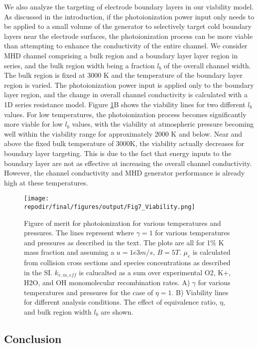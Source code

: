 We also analyze the targeting of electrode boundary layers in our viability model. As discussed in the introduction, if the photoionization power input only needs to be applied to a small volume of the generator to selectively target cold boundary layers near the electrode surfaces, the photoionization process can be more viable than attempting to enhance the conductivity of the entire channel. We consider MHD channel comprising a bulk region and a boundary layer layer region in series, and the bulk region width being a fraction $l_b$ of the overall channel width. The bulk region is fixed at 3000 K and the temperature of the boundary layer region is varied. The photoionization power input is applied only to the boundary layer region, and the change in overall channel conductivity is calculated with a 1D series resistance model. Figure \ref{fig:viability_gamma}B shows the viability lines for two different $l_b$ values. For low temperatures, the photoionization process becomes significantly more viable for low $l_b$ values, with the viability at atmospheric pressure becoming well within the viability range for approximately 2000 K and below. Near and above the fixed bulk temperature of 3000K, the viability actually decreases for boundary layer targeting. This is due to the fact that energy inputs to the boundary layer are not as effective at increasing the overall channel conductivity. However, the channel conductivity and MHD generator performance is already high at these temperatures. 


\begin{figure}[h]
    \centering
    \texttt{[image: \\repodir/final/figures/output/Fig7\_Viability.png]} 
    \caption{Figure of merit for photoionization for various temperatures and pressures. The lines represent where $\gamma = 1$ for various temperatures and pressures as described in the text.   The plots are all for 1\% K mass fraction and assuming a $u=1e3 m/s$, $B=5T$. $\mu_e$ is calculated from collision cross sections and species concentrations as described in the SI. $k_{r,m,eff}$ is calucalted as a sum over experimental O2, K+, H2O,
and OH monomolecular recombination rates. A) $\gamma$ for various temperatures and pressures for the case of $\eta=1$. B) Viability lines for different analysis conditions. The effect of equivalence ratio, $\eta$, and bulk region width $l_b$ are shown.}
    \label{fig:viability_gamma}
\end{figure}



\subsection{Conclusion}


